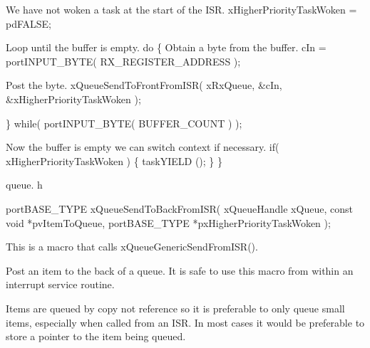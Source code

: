 \begin{DoxyPre}We have not woken a task at the start of the ISR.
        xHigherPriorityTaskWoken = pdFALSE;\end{DoxyPre}



\begin{DoxyPre}Loop until the buffer is empty.
        do
        \{
Obtain a byte from the buffer.
                cIn = portINPUT\_BYTE( RX\_REGISTER\_ADDRESS );\end{DoxyPre}



\begin{DoxyPre}Post the byte.
                xQueueSendToFrontFromISR( xRxQueue, &cIn, &xHigherPriorityTaskWoken );\end{DoxyPre}



\begin{DoxyPre}        \} while( portINPUT\_BYTE( BUFFER\_COUNT ) );\end{DoxyPre}



\begin{DoxyPre}Now the buffer is empty we can switch context if necessary.
        if( xHigherPriorityTaskWoken )
        \{
                taskYIELD ();
        \}
 \}
 \end{DoxyPre}


queue. h 
\begin{DoxyPre}
 portBASE\_TYPE xQueueSendToBackFromISR(
                                                                                 xQueueHandle xQueue,
                                                                                 const void *pvItemToQueue,
                                                                                 portBASE\_TYPE *pxHigherPriorityTaskWoken
                                                                          );
 \end{DoxyPre}


This is a macro that calls x\-Queue\-Generic\-Send\-From\-I\-S\-R().

Post an item to the back of a queue. It is safe to use this macro from within an interrupt service routine.

Items are queued by copy not reference so it is preferable to only queue small items, especially when called from an I\-S\-R. In most cases it would be preferable to store a pointer to the item being queued.


